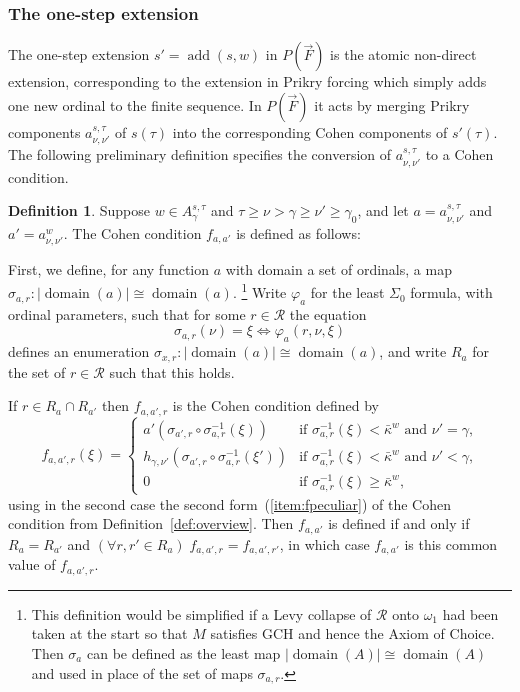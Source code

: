 \documentclass[
twoside,
]{article}
\theoremstyle{definition}
\newtheorem{definition}[theorem]{Definition}
\theoremstyle{remark}
\newcommand{\forceKappa}{\bar\kappa} %
\DeclareMathOperator{\add}{add}
\newcommand\reals{\mathcal{R}}
\renewcommand{\phi}{\varphi}
\newcommand{\card}[1]{|#1|}
\DeclareMathOperator{\domain}{domain}
\begin{document}
\subsubsection{The one-step extension}
\label{sec:one-step}
The one-step extension $s'=\add(s,w)$ in $P(\vec F)$  is the atomic
non-direct extension, corresponding to the extension
in Prikry forcing which simply adds one new ordinal to the finite
sequence.   In $P(\vec F)$ it acts by merging   Prikry components
$a^{s,\tau}_{\nu,\nu'}$ of $s(\tau)$ into the corresponding Cohen components of
$s'(\tau)$.   The following preliminary definition specifies  the
conversion of $a^{s,\tau}_{\nu,\nu'}$ to a Cohen  condition. 

\begin{definition}
  \label{def:a2f}
  Suppose  $w\in A^{s,\tau}_{\gamma}$ and
  $\tau\geq\nu>\gamma\geq\nu'\geq\gamma_0$, and let
  $a=a^{s,\tau}_{\nu,\nu'}$ and $a'=a^{w}_{\nu,\nu'}$.    The Cohen
  condition $f_{a,a'}$ is defined as follows:

  First, we define, for any function $a$ with domain a set of
  ordinals, a map $\sigma_{a,r}\colon
  \card{\domain(a)}\cong\domain(a)$.%
  \footnote{This definition would be simplified if a Levy collapse of
    $\reals$ onto $\omega_1$ had been taken at the start so that 
    $M$ satisfies GCH and hence the Axiom of Choice.  Then $\sigma_a$
    can be defined as the least map
    $\card{\domain(A)}\cong\domain(A)$ and used
    in place of the set of maps $\sigma_{a,r}$.}
  Write $\phi_a$  for 
  the least
  $\Sigma_{0}$ formula, with ordinal parameters, such that for some
  $r\in\reals$ the equation
  \begin{equation}\label{eq:w}
    \sigma_{a,r}(\nu)=\xi\iff \phi_a(r,\nu,\xi)
  \end{equation}
  defines an enumeration $\sigma_{x,r}\colon\card {\domain(a)}\cong
  \domain(a)$, and write $R_a$ for the set of $r\in\reals$ such that
  this holds.
  
  If
  $r\in R_a\cap R_{a'}$  then $f_{a,a',r}$ is the Cohen condition
  defined by 
  \begin{equation}
    \label{eq:faa-def}
    f_{a,a',r}(\xi)=
    \begin{cases}
      a'(\sigma_{a',r}\circ \sigma_{a,r}^{-1}(\xi))&\text{if
        $\sigma_{a,r}^{-1}(\xi)<\forceKappa^{w}$ and $\nu'=\gamma$,}  
      \\
      h_{\gamma,\nu'} (\sigma_{a',r}\circ\sigma_{a,r}^{-1}(\xi'))  &\text{if
        $\sigma_{a,r}^{-1}(\xi)<\forceKappa^{w}$ and 
        $\nu'<\gamma$,} 
      \\
      0&\text{if $\sigma_{a,r}^{-1}(\xi)\ge\forceKappa^{w}$,}
    \end{cases} 
  \end{equation}
  using in the second case the second form~(\ref{item:fpeculiar}) of the Cohen condition
  from Definition~\ref{def:overview}.
  Then $f_{a,a'}$ is defined if  and only if
  $R_a=R_{a'}$ and $(\forall r,r'\in R_a)\;f_{a,a',r}=f_{a,a',r'}$, in
  which case $f_{a,a'}$ is this common  value of $f_{a,a',r}$.
\end{definition}
\end{document}
